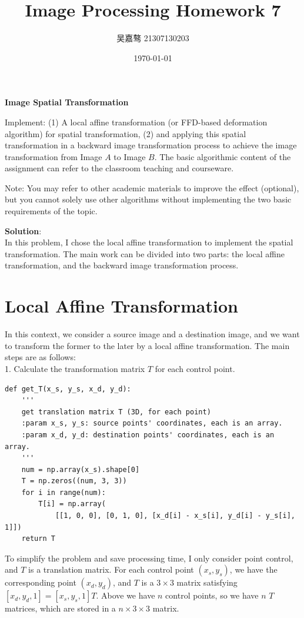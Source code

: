 \documentclass[UTF8]{ctexart}
\title{\textbf{Image Processing Homework 7}}
\author{吴嘉骜 21307130203}
\date{\today}
\begin{document}
\maketitle

{\large \textbf{Image Spatial Transformation}}

Implement: (1) A local affine transformation (or FFD-based deformation algorithm) for spatial transformation, 
(2) and applying this spatial transformation in a backward image transformation process to achieve the image transformation from Image $A$ to Image $B$. 
The basic algorithmic content of the assignment can refer to the classroom teaching and courseware.

Note: You may refer to other academic materials to improve the effect (optional), but you cannot solely use other algorithms without implementing the two basic requirements of the topic.

\textbf{Solution}:\\
In this problem, I chose the local affine transformation to implement the spatial transformation.
The main work can be divided into two parts: the local affine transformation, and the backward image transformation process.

\section{Local Affine Transformation}
In this context, we consider a source image and a destination image, and we want to transform the former to the later by a local affine transformation.
The main steps are as follows:\\

1. Calculate the transformation matrix $T$ for each control point.

\begin{lstlisting}
def get_T(x_s, y_s, x_d, y_d):
    '''
    get translation matrix T (3D, for each point)
    :param x_s, y_s: source points' coordinates, each is an array.
    :param x_d, y_d: destination points' coordinates, each is an array.
    '''
    num = np.array(x_s).shape[0]
    T = np.zeros((num, 3, 3))
    for i in range(num):
        T[i] = np.array(
            [[1, 0, 0], [0, 1, 0], [x_d[i] - x_s[i], y_d[i] - y_s[i], 1]])
    return T
\end{lstlisting}

To simplify the problem and save processing time, I only consider point control, and $T$ is a translation matrix.
For each control point $(x_s, y_s)$, we have the corresponding point $(x_d, y_d)$, and $T$ is a $3\times 3$ matrix satisfying $[x_d, y_d, 1] = [x_s, y_s, 1]T$.
Above we have $n$ control points, so we have $n$ $T$ matrices, which are stored in a $n\times 3\times 3$ matrix.\\
\end{document}
